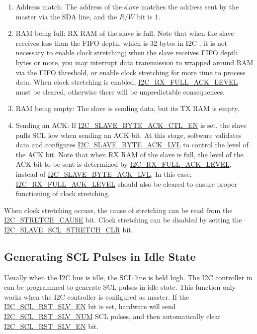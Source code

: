 \documentclass[main\_\_EN.tex]{subfiles}
\begin{document}
\begin{enumerate}
\item Address match: The address of the slave matches the address sent by the master via the SDA line, and the $R/\overline W$ bit is 1.
\item RAM being full: RX RAM of the slave is full. Note that when the slave receives less than the FIFO depth, which is 32 bytes in \chipname{} I2C , it is not necessary to enable clock stretching; when the slave receives FIFO depth bytes or more, you may interrupt data transmission to wrapped around RAM via the FIFO threshold, or enable clock stretching for more time to process data. When clock stretching is enabled, \hyperref[fielddesc:I2CRXFULLACKLEVEL]{I2C\_RX\_FULL\_ACK\_LEVEL} must be cleared, otherwise there will be unpredictable consequences.
\item RAM being empty: The slave is sending data, but its TX RAM is empty.
\item Sending an ACK: If \hyperref[fielddesc:I2CSLAVEBYTEACKCTLEN]{I2C\_SLAVE\_BYTE\_ACK\_CTL\_EN} is set, the slave pulls SCL low when sending an ACK bit. At this stage, software validates data and configures \hyperref[fielddesc:I2CSLAVEBYTEACKLVL]{I2C\_SLAVE\_BYTE\_ACK\_LVL} to control the level of the ACK bit. Note that when RX RAM of the slave is full, the level of the ACK bit to be sent is determined by \hyperref[fielddesc:I2CRXFULLACKLEVEL]{I2C\_RX\_FULL\_ACK\_LEVEL}, instead of \hyperref[fielddesc:I2CSLAVEBYTEACKLVL]{I2C\_SLAVE\_BYTE\_ACK\_LVL}. In this case, \hyperref[fielddesc:I2CRXFULLACKLEVEL]{I2C\_RX\_FULL\_ACK\_LEVEL} should also be cleared to ensure proper functioning of clock stretching.
\end{enumerate}

When clock stretching occurs, the cause of stretching can be read from the \hyperref[fielddesc:I2CSTRETCHCAUSE]{I2C\_STRETCH\_CAUSE} bit. Clock stretching can be disabled by setting the \hyperref[fielddesc:I2CSLAVESCLSTRETCHCLR]{I2C\_SLAVE\_SCL\_STRETCH\_CLR} bit.

\subsection{Generating SCL Pulses in Idle State}
Usually when the I2C bus is idle, the SCL line is held high. The I2C controller in \chipname{} can be programmed to generate SCL pulses in idle state. This function only works when the I2C controller is configured as master. If the \hyperref[fielddesc:I2CSCLRSTSLVEN]{I2C\_SCL\_RST\_SLV\_EN} bit is set, hardware will send \hyperref[fielddesc:I2CSCLRSTSLVNUM]{I2C\_SCL\_RST\_SLV\_NUM} SCL pulses, and then automatically clear \hyperref[fielddesc:I2CSCLRSTSLVEN]{I2C\_SCL\_RST\_SLV\_EN} bit. 
\end{document}
